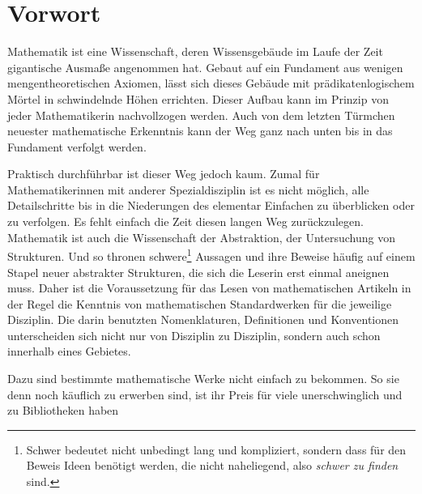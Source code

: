 \documentclass[a4paper,german,10pt,twoside]{book}
\begin{document}
\chapter*{Vorwort}
 Mathematik ist eine Wissenschaft, deren Wissensgeb{\"a}ude im
Laufe der Zeit gigantische Ausma{\ss}e angenommen hat. Gebaut auf ein Fundament aus wenigen
mengentheoretischen Axiomen, l{\"a}sst sich dieses Geb{\"a}ude mit pr{\"a}dikatenlogischem M{\"o}rtel in
schwindelnde H{\"o}hen errichten.
Dieser Aufbau kann im Prinzip von jeder Mathematikerin nachvollzogen werden. Auch von dem letzten
T{\"u}rmchen neuester mathematische Erkenntnis kann der Weg ganz nach unten bis in das Fundament
verfolgt werden.
\par
Praktisch durchf{\"u}hrbar ist dieser Weg jedoch kaum. Zumal f{\"u}r Mathematikerinnen mit anderer
Spezialdisziplin ist es nicht m{\"o}glich, alle Detailschritte bis in die Niederungen des elementar
Einfachen zu {\"u}berblicken oder zu verfolgen. Es fehlt einfach die Zeit diesen langen Weg
zur{\"u}ckzulegen.
Mathematik ist auch die Wissenschaft der Abstraktion, der Untersuchung von Strukturen. Und so
thronen {\glqq schwere\grqq}\footnote{{\glqq Schwer\grqq} bedeutet nicht unbedingt lang und
kompliziert, sondern dass f{\"u}r den Beweis Ideen ben{\"o}tigt werden, die nicht naheliegend, also
\emph{schwer zu finden} sind.} Aussagen und ihre Beweise h{\"a}ufig auf einem Stapel neuer abstrakter
Strukturen, die sich die Leserin erst einmal aneignen muss. Daher ist die Voraussetzung f{\"u}r das
Lesen von mathematischen Artikeln in der Regel die Kenntnis von mathematischen Standardwerken f{\"u}r
die jeweilige Disziplin. Die darin benutzten Nomenklaturen, Definitionen und Konventionen
unterscheiden sich nicht nur von Disziplin zu Disziplin, sondern auch schon innerhalb eines
Gebietes.
\par
Dazu sind bestimmte mathematische Werke nicht einfach zu bekommen. So sie denn
noch k{\"a}uflich zu erwerben sind, ist ihr Preis f{\"u}r viele unerschwinglich und zu Bibliotheken haben
\end{document}
